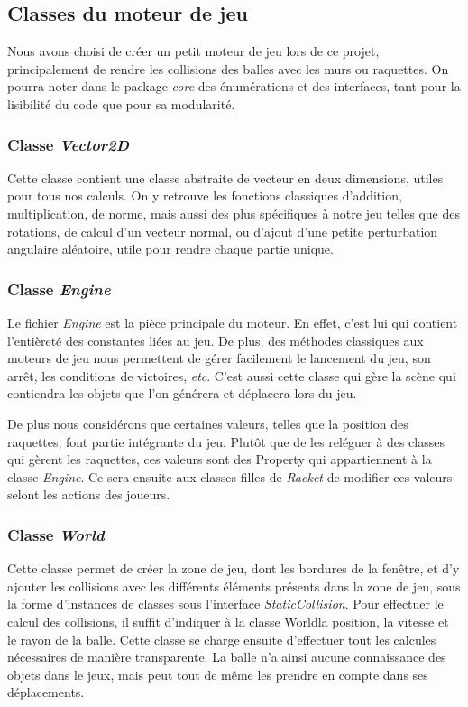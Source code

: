 \documentclass[a4paper,10pt]{article}
\theoremstyle{definition}
\begin{document}
    \subsection{Classes du moteur de jeu}
    Nous avons choisi de créer un petit moteur de jeu lors de ce projet, principalement de rendre les collisions des balles avec les murs ou raquettes. On pourra noter dans le package \emph{core} des énumérations et des interfaces, tant pour la lisibilité du code que pour sa modularité.
    	
	\subsubsection*{Classe \emph{Vector2D}}
	Cette classe contient une classe abstraite de vecteur en deux dimensions, utiles pour tous nos calculs. On y retrouve les fonctions classiques d'addition, multiplication, de norme, mais aussi des plus spécifiques à notre jeu telles que des rotations, de calcul d'un vecteur normal, ou d'ajout d'une petite perturbation angulaire aléatoire, utile pour rendre chaque partie unique.
	
	\subsubsection*{Classe \emph{Engine}}
	Le fichier \emph{Engine} est la pièce principale du moteur. En effet, c'est lui qui contient l'entièreté des constantes liées au jeu. De plus, des méthodes classiques aux moteurs de jeu nous permettent de gérer facilement le lancement du jeu, son arrêt, les conditions de victoires, \emph{etc}. C'est aussi cette classe qui gère la scène qui contiendra les objets que l'on générera et déplacera lors du jeu.
	
	De plus nous considérons que certaines valeurs, telles que la position des raquettes, font partie intégrante du jeu. Plutôt que de les reléguer à des classes qui gèrent les raquettes, ces valeurs sont des \og Property \fg qui appartiennent à la classe \emph{Engine}. Ce sera ensuite aux classes filles de \emph{Racket} de modifier ces valeurs selont les actions des joueurs.
        \subsubsection*{Classe \emph{World}}
	Cette classe permet de créer la zone de jeu, dont les bordures de la fenêtre, et d'y ajouter les collisions avec les différents éléments présents dans la zone de jeu, sous la forme d'instances de classes sous l'interface \emph{StaticCollision}. Pour effectuer le calcul des collisions, il suffit d'indiquer à la classe \og World\fg la position, la vitesse et le rayon de la balle. Cette classe se charge ensuite d'effectuer tout les calcules nécessaires de manière transparente. La balle n'a ainsi aucune connaissance des objets dans le jeux, mais peut tout de même les prendre en compte dans ses déplacements.
        
\end{document}
